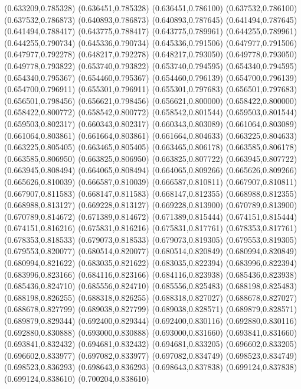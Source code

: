 (0.633209,0.785328)
(0.636451,0.785328)
(0.636451,0.786100)
(0.637532,0.786100)
(0.637532,0.786873)
(0.640893,0.786873)
(0.640893,0.787645)
(0.641494,0.787645)
(0.641494,0.788417)
(0.643775,0.788417)
(0.643775,0.789961)
(0.644255,0.789961)
(0.644255,0.790734)
(0.645336,0.790734)
(0.645336,0.791506)
(0.647977,0.791506)
(0.647977,0.792278)
(0.648217,0.792278)
(0.648217,0.793050)
(0.649778,0.793050)
(0.649778,0.793822)
(0.653740,0.793822)
(0.653740,0.794595)
(0.654340,0.794595)
(0.654340,0.795367)
(0.654460,0.795367)
(0.654460,0.796139)
(0.654700,0.796139)
(0.654700,0.796911)
(0.655301,0.796911)
(0.655301,0.797683)
(0.656501,0.797683)
(0.656501,0.798456)
(0.656621,0.798456)
(0.656621,0.800000)
(0.658422,0.800000)
(0.658422,0.800772)
(0.658542,0.800772)
(0.658542,0.801544)
(0.659503,0.801544)
(0.659503,0.802317)
(0.660343,0.802317)
(0.660343,0.803089)
(0.661064,0.803089)
(0.661064,0.803861)
(0.661664,0.803861)
(0.661664,0.804633)
(0.663225,0.804633)
(0.663225,0.805405)
(0.663465,0.805405)
(0.663465,0.806178)
(0.663585,0.806178)
(0.663585,0.806950)
(0.663825,0.806950)
(0.663825,0.807722)
(0.663945,0.807722)
(0.663945,0.808494)
(0.664065,0.808494)
(0.664065,0.809266)
(0.665626,0.809266)
(0.665626,0.810039)
(0.666587,0.810039)
(0.666587,0.810811)
(0.667907,0.810811)
(0.667907,0.811583)
(0.668147,0.811583)
(0.668147,0.812355)
(0.668988,0.812355)
(0.668988,0.813127)
(0.669228,0.813127)
(0.669228,0.813900)
(0.670789,0.813900)
(0.670789,0.814672)
(0.671389,0.814672)
(0.671389,0.815444)
(0.674151,0.815444)
(0.674151,0.816216)
(0.675831,0.816216)
(0.675831,0.817761)
(0.678353,0.817761)
(0.678353,0.818533)
(0.679073,0.818533)
(0.679073,0.819305)
(0.679553,0.819305)
(0.679553,0.820077)
(0.680514,0.820077)
(0.680514,0.820849)
(0.680994,0.820849)
(0.680994,0.821622)
(0.683035,0.821622)
(0.683035,0.822394)
(0.683996,0.822394)
(0.683996,0.823166)
(0.684116,0.823166)
(0.684116,0.823938)
(0.685436,0.823938)
(0.685436,0.824710)
(0.685556,0.824710)
(0.685556,0.825483)
(0.688198,0.825483)
(0.688198,0.826255)
(0.688318,0.826255)
(0.688318,0.827027)
(0.688678,0.827027)
(0.688678,0.827799)
(0.689038,0.827799)
(0.689038,0.828571)
(0.689879,0.828571)
(0.689879,0.829344)
(0.692400,0.829344)
(0.692400,0.830116)
(0.692880,0.830116)
(0.692880,0.830888)
(0.693000,0.830888)
(0.693000,0.831660)
(0.693841,0.831660)
(0.693841,0.832432)
(0.694681,0.832432)
(0.694681,0.833205)
(0.696602,0.833205)
(0.696602,0.833977)
(0.697082,0.833977)
(0.697082,0.834749)
(0.698523,0.834749)
(0.698523,0.836293)
(0.698643,0.836293)
(0.698643,0.837838)
(0.699124,0.837838)
(0.699124,0.838610)
(0.700204,0.838610)
